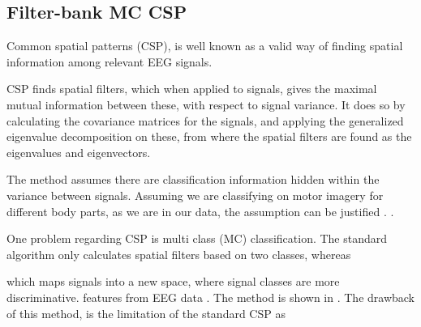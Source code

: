 \subsection{Filter-bank MC CSP}
Common spatial patterns (CSP), is well known as a valid way of finding spatial information among  relevant EEG signals. 

CSP finds spatial filters, which when applied to signals, gives the maximal mutual information between these, with respect to signal variance. It does so by calculating the covariance matrices for the signals, and applying the generalized eigenvalue decomposition on these, from where the spatial filters are found as the eigenvalues and eigenvectors.

The method assumes there are classification information hidden within the variance between signals. Assuming we are classifying on motor imagery for different body parts, as we are in our data, the assumption can be justified \cite{blankertz2008optimizing}. .

One problem regarding CSP is multi class (MC) classification. The standard algorithm only calculates spatial filters based on two classes, whereas     

which maps signals into a new space, where signal classes are more discriminative.  features from EEG data . The method is shown in .  The drawback of this method, is the limitation of the standard CSP as 


